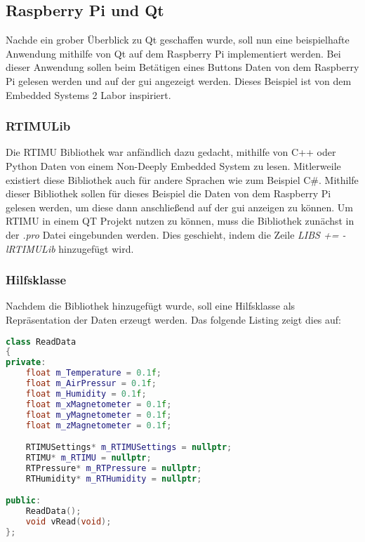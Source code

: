 \subsection{Raspberry Pi und Qt}
\label{subsec:rasPiUndQt}
Nachde ein grober Überblick zu Qt geschaffen wurde, soll nun eine beispielhafte Anwendung
mithilfe von Qt auf dem Raspberry Pi implementiert werden. Bei dieser Anwendung sollen beim
Betätigen eines Buttons Daten von dem Raspberry Pi gelesen werden und auf der \ac{gui} angezeigt
werden. Dieses Beispiel ist von dem Embedded Systems 2 Labor inspiriert.

\subsubsection{RTIMULib}
\label{subsubsec:RTIMULib}
Die RTIMU Bibliothek war anfändlich dazu gedacht, mithilfe von C++ oder
Python Daten von einem Non-Deeply Embedded System zu lesen. Mitlerweile existiert diese
Bibliothek auch für andere Sprachen wie zum Beispiel C\#.
\newline
\newline
Mithilfe dieser Bibliothek sollen für dieses Beispiel die Daten von dem Raspberry Pi gelesen
werden, um diese dann anschließend auf der \ac{gui} anzeigen zu können. Um RTIMU in einem QT
Projekt nutzen zu können, muss die Bibliothek zunächst in der \emph{.pro} Datei eingebunden
werden. Dies geschieht, indem die Zeile \emph{LIBS += -lRTIMULib} hinzugefügt wird.

\subsubsection{Hilfsklasse}
\label{subsubsec:Hilfsklasse}
Nachdem die Bibliothek hinzugefügt wurde, soll eine Hilfsklasse als Repräsentation der Daten
erzeugt werden. Das folgende Listing zeigt dies auf:

\begin{lstlisting}[language=C++, caption=RTIMU-Hilfsklasse, label=lst:Hilfsklasse]
class ReadData
{
private:
    float m_Temperature = 0.1f;
    float m_AirPressur = 0.1f;
    float m_Humidity = 0.1f;
    float m_xMagnetometer = 0.1f;
    float m_yMagnetometer = 0.1f;
    float m_zMagnetometer = 0.1f;

    RTIMUSettings* m_RTIMUSettings = nullptr;
    RTIMU* m_RTIMU = nullptr;
    RTPressure* m_RTPressure = nullptr;
    RTHumidity* m_RTHumidity = nullptr;

public:
    ReadData();
    void vRead(void);
};

\end{lstlisting}

